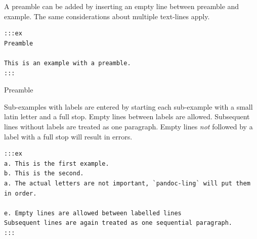 \documentclass[
]{article}
\begin{document}
\begin{samepage}
\begin{exe} \judgewidth{}
  \label{id}
\end{exe}
\end{samepage}

A preamble can be added by inserting an empty line between preamble and
example. The same considerations about multiple text-lines apply.

\begin{verbatim}
:::ex
Preamble

This is an example with a preamble.
:::
\end{verbatim}

\begin{samepage}
\begin{exe} \judgewidth{}
  \ex Preamble
  \label{ex:4.3}
\end{exe}
\end{samepage}

Sub-examples with labels are entered by starting each sub-example with a
small latin letter and a full stop. Empty lines between labels are
allowed. Subsequent lines without labels are treated as one paragraph.
Empty lines \emph{not} followed by a label with a full stop will result
in errors.

\begin{verbatim}
:::ex
a. This is the first example.
b. This is the second.
a. The actual letters are not important, `pandoc-ling` will put them in order.

e. Empty lines are allowed between labelled lines
Subsequent lines are again treated as one sequential paragraph.
:::
\end{verbatim}

\begin{samepage}
\begin{exe} \judgewidth{}
  \ex 
  \begin{xlist}
  \end{xlist}
  \label{ex:4.4}
\end{exe}
\end{samepage}
\end{document}
